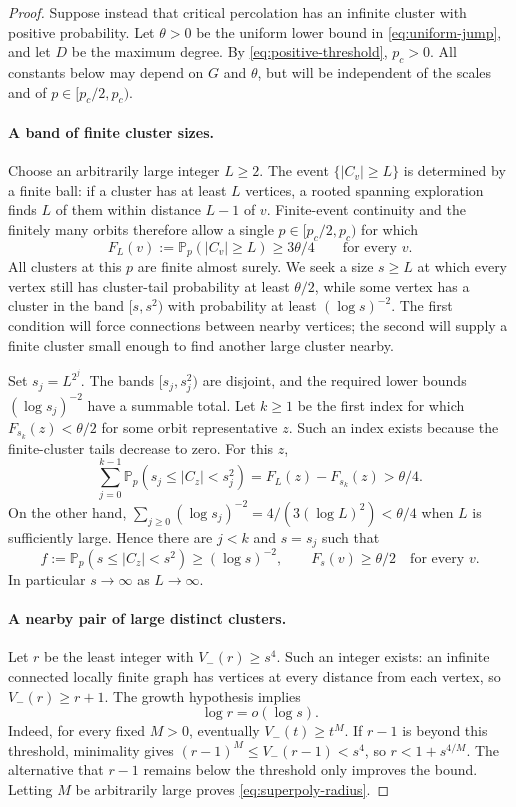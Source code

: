 \documentclass[11pt]{article}
\theoremstyle{definition}
\newcommand{\PP}{\mathbb P}
\newcommand{\pc}{p_c}
\begin{document}
\begin{proof}
Suppose instead that critical percolation has an infinite cluster with
positive probability. Let $\theta>0$ be the uniform lower bound in
\eqref{eq:uniform-jump}, and let $D$ be the maximum degree.
By \eqref{eq:positive-threshold}, $\pc>0$.
All constants below may depend on $G$ and $\theta$, but will be
independent of the scales and of $p\in[\pc/2,\pc)$.

\paragraph{A band of finite cluster sizes.}
Choose an arbitrarily large integer $L\ge2$. The event
$\{|C_v|\ge L\}$ is determined by a finite ball: if a cluster has
at least $L$ vertices, a rooted spanning exploration finds $L$ of them
within distance $L-1$ of $v$. Finite-event continuity and the finitely
many orbits therefore allow a single $p\in[\pc/2,\pc)$ for which
\[
 F_L(v):=\PP_p(|C_v|\ge L)\ge3\theta/4
 \qquad\text{for every }v.
\]
All clusters at this $p$ are finite almost surely. We seek a size
$s\ge L$ at which every vertex still has cluster-tail probability at
least $\theta/2$, while some vertex has a cluster in the band
$[s,s^2)$ with probability at least $(\log s)^{-2}$. The first condition
will force connections between nearby vertices; the second will supply
a finite cluster small enough to find another large cluster nearby.

Set $s_j=L^{2^j}$. The bands $[s_j,s_j^2)$ are disjoint, and the required
lower bounds $(\log s_j)^{-2}$ have a summable total. Let $k\ge1$ be
the first index for which
$F_{s_k}(z)<\theta/2$ for some orbit representative $z$.
Such an index exists because the finite-cluster tails decrease to zero.
For this $z$,
\[
 \sum_{j=0}^{k-1}\PP_p(s_j\le |C_z|<s_j^2)
 =F_L(z)-F_{s_k}(z)>\theta/4.
\]
On the other hand,
$\sum_{j\ge0}(\log s_j)^{-2}=4/(3(\log L)^2)<\theta/4$
when $L$ is sufficiently large. Hence there are $j<k$ and $s=s_j$
such that
\begin{equation}\label{eq:superpoly-band}
 f:=\PP_p(s\le |C_z|<s^2)\ge(\log s)^{-2},
 \qquad F_s(v)\ge\theta/2\quad\text{for every }v.
\end{equation}
In particular $s\to\infty$ as $L\to\infty$.

\paragraph{A nearby pair of large distinct clusters.}
Let $r$ be the least integer with $V_-(r)\ge s^4$.
Such an integer exists: an infinite connected locally finite graph has
vertices at every distance from each vertex, so $V_-(r)\ge r+1$.
The growth hypothesis implies
\begin{equation}\label{eq:superpoly-radius}
 \log r=o(\log s).
\end{equation}
Indeed, for every fixed $M>0$, eventually $V_-(t)\ge t^M$.
If $r-1$ is beyond this threshold, minimality gives
$(r-1)^M\le V_-(r-1)<s^4$, so $r<1+s^{4/M}$.
The alternative that $r-1$ remains below the threshold only improves
the bound. Letting $M$ be arbitrarily large proves
\eqref{eq:superpoly-radius}.


\end{proof}
\end{document}

